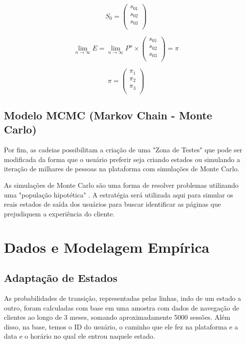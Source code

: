 \begin{equation}
S_0 = \begin{pmatrix}
s_{01} \\
s_{02} \\
s_{03} \\
\end{pmatrix}
\label{eq:s0}
\end{equation}

\begin{equation}
\lim_{n \to \infty} E = \lim_{n \to \infty} P^n \times \begin{pmatrix}
s_{01} \\
s_{02} \\
s_{03} \\
\end{pmatrix} = \pi
\label{eq:lim}
\end{equation}

\begin{equation}
\pi = \begin{pmatrix}
\pi_1 \\
\pi_2 \\
\pi_3 \\
\end{pmatrix}
\label{eq:pi}
\end{equation}

\subsection{Modelo MCMC (Markov Chain - Monte Carlo)}

Por fim, as cadeias possibilitam a criação de uma "Zona de Testes" que pode ser modificada da forma que o usuário preferir seja criando estados ou simulando a iteração de milhares de pessoas na plataforma com simulações de Monte Carlo.

As simulações de Monte Carlo são uma forma de resolver problemas utilizando uma "população hipotética" \cite{james1980monte}. A estratégia será utilizada aqui para simular os reais estados de saída dos usuários para buscar identificar as páginas que prejudiquem a experiência do cliente. 

\section{Dados e Modelagem Empírica}

\subsection{Adaptação de Estados}
As probabilidades de transição, representadas pelas linhas, indo de um estado a outro, foram calculadas com base em uma amostra com dados de navegação de clientes ao longo de 3 meses, somando aproximadamente 5000 sessões. Além disso, na base, temos o ID do usuário, o caminho que ele fez na plataforma e a data e o horário no qual ele entrou naquele estado.

